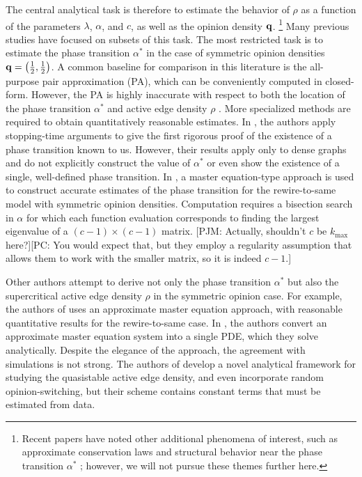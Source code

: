 \documentclass[review, onefignum, onetabnum]{siamart171218}
\newcommand{\pjm}[1]{{\color{blue}[PJM: #1]}}
\newcommand{\pc}[1]{{\color{comment_purple}[PC: #1]}}
\begin{document}
		
		The central analytical task is therefore to estimate the behavior of $\rho$ as a function of the parameters $\lambda$, $\alpha$, and $c$, as well as the opinion density $\mathbf{q}$.
		\footnote{Recent papers have noted other additional phenomena of interest, such as approximate conservation laws \cite{Toruniewska2017} and structural behavior near the phase transition $\alpha^*$ \cite{Horstmeyer2018}; however, we will not pursue these themes further here.}
		Many previous studies have focused on subsets of this task.
		The most restricted task is to estimate the phase transition $\alpha^*$ in the case of symmetric opinion densities  $\mathbf{q} = \left(\frac{1}{2}, \frac{1}{2}\right)$.
		A common baseline for comparison in this literature is the all-purpose pair approximation (PA), which can be conveniently computed in closed-form. 
		However, the PA is highly inaccurate with respect to both the location of the phase transition $\alpha^*$ and active edge density $\rho$ \cite{Demirel2012, Durrett2012}. 
		More specialized methods are required to obtain quantitatively reasonable estimates. 
		In \cite{Basu2015a}, the authors apply stopping-time arguments to give the first rigorous proof of the existence of a phase transition known to us. 
		However, their results apply only to dense graphs and do not explicitly construct the value of $\alpha^*$ or even show the existence of a single, well-defined phase transition. 
		In \cite{Bohme2011}, a master equation-type approach is used to construct accurate estimates of the phase transition for the rewire-to-same model with symmetric opinion densities. 
		Computation requires a bisection search in $\alpha$ for which each function evaluation corresponds to finding the largest eigenvalue of a $(c-1) \times (c-1)$ matrix. \pjm{Actually, shouldn't $c$ be $k_\mathrm{max}$ here?}\pc{You would expect that, but they employ a regularity assumption that allows them to work with the smaller matrix, so it is indeed $c-1$.}
		
		Other authors attempt to derive not only the phase transition $\alpha^*$ but also the supercritical active edge density $\rho$ in the symmetric opinion case. 
		For example, the authors of \cite{Demirel2012} uses an approximate master equation approach, with reasonable quantitative results for the rewire-to-same case. 
		In \cite{Silk2014}, the authors convert an approximate master equation system into a single PDE, which they solve analytically. 
		Despite the elegance of the approach, the agreement with simulations is not strong. 
		The authors of \cite{Ji2013}  develop a novel analytical framework for studying the quasistable active edge density, and even incorporate random opinion-switching, but their scheme contains constant terms that must be estimated from data. 
			
\end{document}

